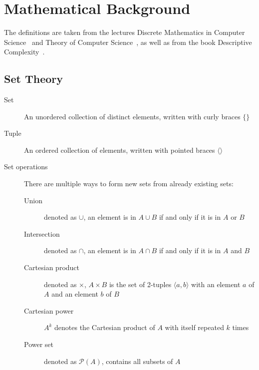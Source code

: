 \chapter{Mathematical Background}\label{ch:mathematical-background}

The definitions are taken from the lectures Discrete Mathematics in Computer Science~\cite{discrete-maths} and Theory of Computer Science~\cite{theory-cs}, as well as from the book Descriptive Complexity~\cite{descriptive-complexity}.


\section{Set Theory}\label{sec:set-theory}
\begin{description}
    \item[Set] An unordered collection of distinct elements, written with curly braces $\{\}$
    \item[Tuple] An ordered collection of elements, written with pointed braces $\langle  \rangle$
    \item[Set operations] There are multiple ways to form new sets from already existing sets:
    \begin{description}
        \item[Union] denoted as $\cup$, an element is in $A \cup B$ if and only if it is in $A$ or $B$
        \item[Intersection] denoted as $\cap$, an element is in $A \cap B$ if and only if it is in $A$ and $B$
        \item[Cartesian product] denoted as $\times$, $A \times B$ is the set of 2-tuples $\langle a, b\rangle$ with an element $a$ of $A$ and an element $b$ of $B$
        \item[Cartesian power] $A^k$ denotes the Cartesian product of $A$ with itself repeated $k$ times
        \item[Power set] denoted as $\mathcal{P}(A)$, contains all subsets of $A$
    \end{description}
\end{description}


